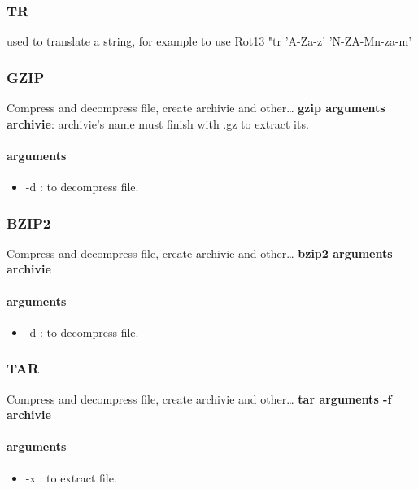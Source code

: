 \documentclass{article}
\begin{document}
                \subsubsection{TR}
                    used to translate a string, for example to use Rot13 "tr 'A-Za-z' 'N-ZA-Mn-za-m'
                 \subsubsection{GZIP}
                    Compress and decompress file, create archivie and other\dots
                    \textbf{gzip arguments archivie}: archivie's name must finish with .gz to extract its.
                    \paragraph{arguments}
                    \begin{itemize}
                        \item -d : to decompress file.
                    \end{itemize}
                \subsubsection{BZIP2}
                    Compress and decompress file, create archivie and other\dots
                    \textbf{bzip2 arguments archivie}
                    \paragraph{arguments}
                    \begin{itemize}
                        \item -d : to decompress file.
                    \end{itemize}
                \subsubsection{TAR}
                    Compress and decompress file, create archivie and other\dots
                    \textbf{tar arguments  -f archivie}
                    \paragraph{arguments}
                    \begin{itemize}
                        \item -x : to extract file.
                    \end{itemize}
\end{document}
